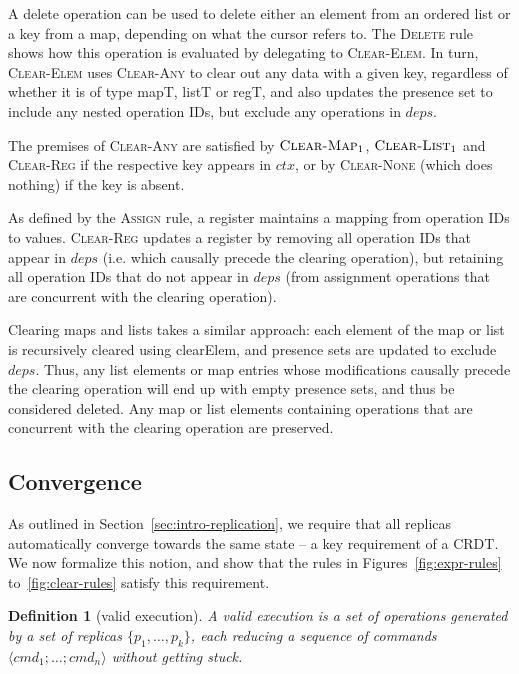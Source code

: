 \documentclass[10pt,journal,compsoc]{IEEEtran}
\newtheorem{definition}{Definition}
\begin{document}
A \textsf{delete} operation can be used to delete either an element from an ordered list or a key from a map, depending on what the cursor refers to. The \textsc{Delete} rule shows how this operation is evaluated by delegating to \textsc{Clear-Elem}. In turn, \textsc{Clear-Elem} uses \textsc{Clear-Any} to clear out any data with a given key, regardless of whether it is of type \textsf{mapT}, \textsf{listT} or \textsf{regT}, and also updates the presence set to include any nested operation IDs, but exclude any operations in $\mathit{deps}$.

The premises of \textsc{Clear-Any} are satisfied by $\textsc{Clear-Map}_1$, $\textsc{Clear-List}_1$ and \textsc{Clear-Reg} if the respective key appears in $\mathit{ctx}$, or by \textsc{Clear-None} (which does nothing) if the key is absent.

As defined by the \textsc{Assign} rule, a register maintains a mapping from operation IDs to values. \textsc{Clear-Reg} updates a register by removing all operation IDs that appear in $\mathit{deps}$ (i.e. which causally precede the clearing operation), but retaining all operation IDs that do not appear in $\mathit{deps}$ (from assignment operations that are concurrent with the clearing operation).

Clearing maps and lists takes a similar approach: each element of the map or list is recursively cleared using \textsf{clearElem}, and presence sets are updated to exclude $\mathit{deps}$. Thus, any list elements or map entries whose modifications causally precede the clearing operation will end up with empty presence sets, and thus be considered deleted. Any map or list elements containing operations that are concurrent with the clearing operation are preserved.

\subsection{Convergence}\label{sec:convergence}

As outlined in Section~\ref{sec:intro-replication}, we require that all replicas automatically converge towards the same state -- a key requirement of a CRDT. We now formalize this notion, and show that the rules in Figures~\ref{fig:expr-rules} to~\ref{fig:clear-rules} satisfy this requirement.

\begin{definition}[valid execution]\label{def:valid-exec}
A \emph{valid execution} is a set of operations generated by a set of replicas $\{p_1, \dots, p_k\}$, each reducing a sequence of commands $\langle \mathit{cmd}_1 \mathbin{;} \dots \mathbin{;} \mathit{cmd}_n \rangle$ without getting stuck.
\end{definition}
\end{document}

